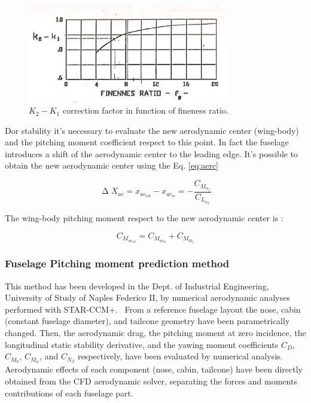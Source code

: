 \begin{figure}[H]
\centering
\includegraphics[height=4.3cm]{Immagini/kdue}
\caption{$K_2-K_1$ correction factor in function of fineness ratio.}
\label{kfactor}
\end{figure}

Dor stability it's necessary to evaluate the new aerodynamic center (wing-body) and the pitching moment coefficient respect to this point. In fact the fuselage introduces a shift of the aerodynamic center to the leading edge. 
It's possible to obtain the new aerodynamic center using the Eq. \ref{eq:aerc}

\begin{equation}
\upDelta X_{ac} = x_{ac_{wb}} - x_{ac_{w}} = -\frac{C_{M_{\alpha_f}}}{C_{L_{\alpha_f}}}
\label{eq:aerc}
\end{equation}

The wing-body pitching moment respect to the new aerodynamic center is :

\begin{equation}
C_{M_{ac_{wb}}} = C_{M_{ac_{w}}}  + C_{M_{0l_f}}
\end{equation}

\subsubsection{Fuselage Pitching moment prediction method}
This method has been developed in the Dept. of Industrial Engineering, University of Study of Naples Federico II, by numerical aerodynamic analyses performed with STAR-CCM+. \
From a reference fuselage layout the nose, cabin (constant fuselage diameter), and tailcone geometry have been parametrically changed. Then, the aerodynamic drag, the pitching moment at zero incidence, the longitudinal static stability derivative, and the yawing moment coefficients $C_D$, $C_{M_0}$, $C_{M_{\alpha}}$, and $C_{N_{\beta}}$ respectively, have been evaluated by numerical analysis. Aerodynamic effects of each component (nose, cabin, tailcone) have been directly obtained from the CFD aerodynamic solver, separating the forces and moments contributions of each fuselage part. \cite{fuselageunina}


